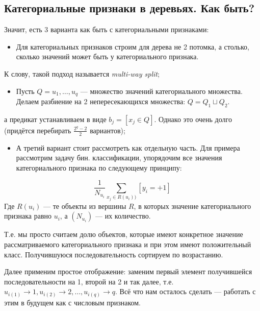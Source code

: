 \subsection*{Категориальные признаки в деревьях. Как быть?}

Значит, есть 3 варианта как быть с категориальными признаками:

\begin{itemize}
  \item Для категориальных признаков строим для дерева не 2 потомка, а столько, сколько значений может быть у категориального признака.
\end{itemize}

К слову, такой подход называется \textit{multi-way split};

\begin{itemize}
  \item Пусть \(Q = u_1, \ldots, u_q\) — множество значений категориального множества. Делаем разбиение на 2 непересекающихся множества: \(Q = Q_1 \sqcup Q_2\).
\end{itemize}

а предикат устанавливаем в виде \(b_j = [x_j \in Q]\). Однако это очень долго (придётся перебирать \(\frac{2^q- 2}{2}\) вариантов);

\begin{itemize}
  \item А третий вариант стоит рассмотреть как отдельную часть. Для примера рассмотрим задачу бин. классификации, упорядочим все значения категориального признака по следующему принципу:
\end{itemize}

\[
\frac{1}{N_{u_i}} \sum_{x_j \in R(u_i))} [y_i = +1]
\]
Где \(R(u_i)\) — те объекты из вершины \(R\), в которых значение категориального признака равно \(u_i\), а \((N_{u_i})\) — их количество. 

Т.е. мы просто считаем долю объектов, которые имеют конкретное значение рассматриваемого категориального признака и при этом имеют положительный класс. Получившуюся последовательность сортируем по возрастанию.

Далее применим простое отображение: заменим первый элемент получившейся последовательности на 1, второй на 2 и так далее, т.е. \(u_{i(1)} \to 1, u_{i(2)} \to 2, \ldots, u_{i(q)} \to q\). Всё что нам осталось сделать — работать с этим в будущем как с числовым признаком.
